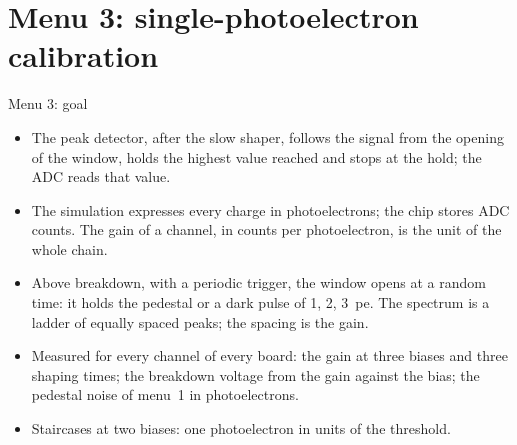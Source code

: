 \section{Menu 3: single-photoelectron calibration}

\begin{frame}{Menu 3: goal}
\begin{itemize}
\item The peak detector, after the slow shaper, follows the signal from the opening of the
  window, holds the highest value reached and stops at the hold; the ADC reads that value.
\item The simulation expresses every charge in photoelectrons; the chip stores ADC counts.
  The gain of a channel, in counts per photoelectron, is the unit of the whole chain.
\item Above breakdown, with a periodic trigger, the window opens at a random time: it holds
  the pedestal or a dark pulse of 1, 2, 3~pe. The spectrum is a ladder of equally spaced
  peaks; the spacing is the gain.
\item Measured for every channel of every board: the gain at three biases and three shaping
  times; the breakdown voltage from the gain against the bias; the pedestal noise of menu~1 in
  photoelectrons.
\item Staircases at two biases: one photoelectron in units of the threshold.
\end{itemize}
\end{frame}

